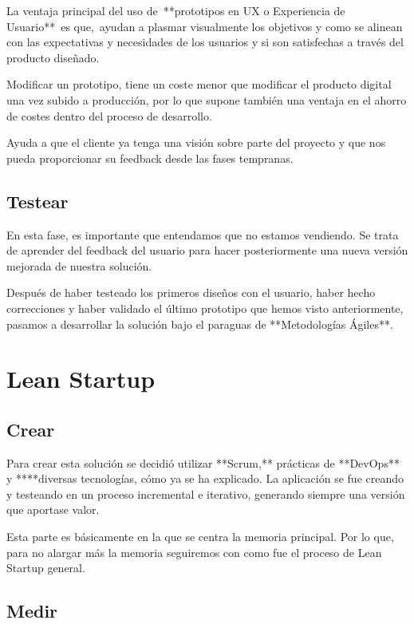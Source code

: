\documentclass[12pt,twoside,titlepage]{report}
\begin{document}
{La ventaja principal del uso de **prototipos en UX o Experiencia de Usuario** es que, ayudan a plasmar visualmente los objetivos y como se alinean con las expectativas y necesidades de los usuarios y si son satisfechas a través del producto diseñado.

Modificar un prototipo, tiene un coste menor que modificar el producto digital una vez subido a producción, por lo que supone también una ventaja en el ahorro de costes dentro del proceso de desarrollo.

Ayuda a que el cliente ya tenga una visión sobre parte del proyecto y que nos pueda proporcionar su feedback desde las fases tempranas.

\subsection{Testear}

En esta fase, es importante que entendamos que no estamos vendiendo. Se trata de aprender del feedback del usuario para hacer posteriormente una nueva versión mejorada de nuestra solución.

Después de haber testeado los primeros diseños con el usuario, haber hecho correcciones y haber validado el último prototipo que hemos visto anteriormente, pasamos a desarrollar la solución bajo el paraguas de **Metodologías Ágiles**.

\section{Lean Startup}

\subsection{Crear}

Para crear esta solución se decidió utilizar **Scrum,** prácticas de **DevOps** y ****diversas tecnologías, cómo ya se ha explicado. La aplicación se fue creando y testeando en un proceso incremental e iterativo, generando siempre una versión que aportase valor.

Esta parte es básicamente en la que se centra la memoria principal. Por lo que, para no alargar más la memoria seguiremos con como fue el proceso de Lean Startup general.

\subsection{Medir}

}
\end{document}

